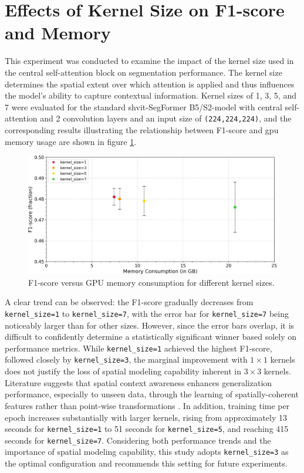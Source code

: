 \section{Effects of Kernel Size on F1-score and Memory}
This experiment was conducted to examine the impact of the kernel size used in the central self-attention block on segmentation performance. The kernel size determines the spatial extent over which attention is applied and thus influences the model's ability to capture contextual information. Kernel sizes of 1, 3, 5, and 7 were evaluated for the standard  \gls{shvit}-SegFormer B5/S2-model with central self-attention and 2 convolution layers and an input size of {\tt (224,224,224)}, and the corresponding results illustrating the relationship between F1-score and \acrshort{gpu} memory usage are shown in figure \ref{iou_vs_kernel_memory}. 
\begin{figure}[H]
	\centering
	\includegraphics[width=1.0\textwidth]{./images/F1_vs_kernel_memory.png}
	\caption[F1-score versus GPU memory consumption for different kernel sizes]{F1-score versus GPU memory consumption for different kernel sizes.}
	\label{iou_vs_kernel_memory}
\end{figure}
A clear trend can be observed: the F1-score gradually decreases from {\tt kernel\_size=1} to {\tt kernel\_size=7}, with the error bar for {\tt kernel\_size=7} being noticeably larger than for other sizes. However, since the error bars overlap, it is difficult to confidently determine a statistically significant winner based solely on performance metrics. While {\tt kernel\_size=1} achieved the highest F1-score, followed closely by {\tt kernel\_size=3}, the marginal improvement with $1 \times 1$ kernels does not justify the loss of spatial modeling capability inherent in $3 \times 3$ kernels. Literature suggests that spatial context awareness enhances generalization performance, especially to unseen data, through the learning of spatially-coherent features rather than point-wise transformations \cite{he2015deepresiduallearningimage, simonyan2015deepconvolutionalnetworkslargescale, chollet2017xception}. In addition, training time per epoch increases substantially with larger kernels, rising from approximately 13 seconds for {\tt kernel\_size=1} to 51 seconds for {\tt kernel\_size=5}, and reaching 415 seconds for {\tt kernel\_size=7}. Considering both performance trends and the importance of spatial modeling capability, this study adopts {\tt kernel\_size=3} as the optimal configuration and recommends this setting for future experiments.

